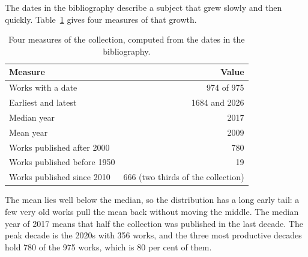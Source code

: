 The dates in the bibliography describe a subject that grew slowly and then %
quickly. %
Table~\ref{tab:atlas:growth} gives four measures of that growth. %

\begin{table}[htbp]
  \centering
  \caption{Four measures of the collection, computed from the dates in the
  bibliography.} %
  \label{tab:atlas:growth}
  \begin{tabular}{lr}
    \toprule
    Measure & Value \\ %
    \midrule
    Works with a date            & 974 of 975 \\ %
    Earliest and latest          & 1684 and 2026 \\ %
    Median year                  & 2017 \\ %
    Mean year                    & 2009 \\ %
    Works published after 2000   & 780 \\ %
    Works published before 1950  & 19 \\ %
    Works published since 2010   & 666 (two thirds of the collection) \\ %
    \bottomrule
  \end{tabular}
\end{table}

The mean lies well below the median, so the distribution has a long %
early tail: a few very old works pull the mean back without moving the middle. %
The median year of 2017 means that half the collection was published in the %
last decade. %
The peak decade is the 2020s with 356 works, and the three most productive %
decades hold 780 of the 975 works, which is 80 per cent of them. %

